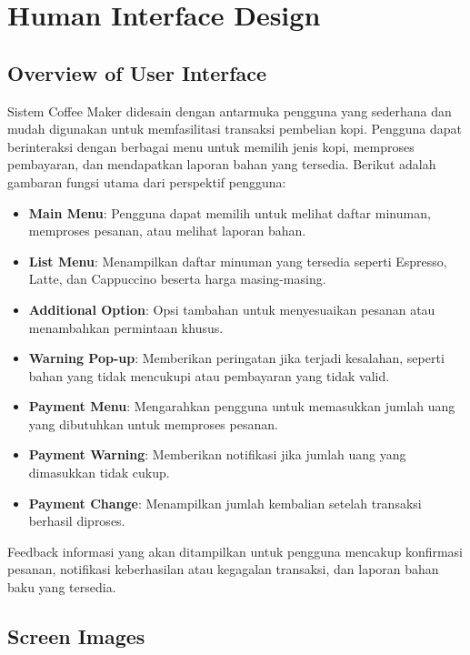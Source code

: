 \documentclass[12pt]{article}
\begin{document}
\section{Human Interface Design}

\subsection{Overview of User Interface}
Sistem Coffee Maker didesain dengan antarmuka pengguna yang sederhana dan mudah digunakan untuk memfasilitasi transaksi pembelian kopi. Pengguna dapat berinteraksi dengan berbagai menu untuk memilih jenis kopi, memproses pembayaran, dan mendapatkan laporan bahan yang tersedia. Berikut adalah gambaran fungsi utama dari perspektif pengguna:

\begin{itemize}
    \item \textbf{Main Menu}: Pengguna dapat memilih untuk melihat daftar minuman, memproses pesanan, atau melihat laporan bahan.
    \item \textbf{List Menu}: Menampilkan daftar minuman yang tersedia seperti Espresso, Latte, dan Cappuccino beserta harga masing-masing.
    \item \textbf{Additional Option}: Opsi tambahan untuk menyesuaikan pesanan atau menambahkan permintaan khusus.
    \item \textbf{Warning Pop-up}: Memberikan peringatan jika terjadi kesalahan, seperti bahan yang tidak mencukupi atau pembayaran yang tidak valid.
    \item \textbf{Payment Menu}: Mengarahkan pengguna untuk memasukkan jumlah uang yang dibutuhkan untuk memproses pesanan.
    \item \textbf{Payment Warning}: Memberikan notifikasi jika jumlah uang yang dimasukkan tidak cukup.
    \item \textbf{Payment Change}: Menampilkan jumlah kembalian setelah transaksi berhasil diproses.
\end{itemize}

Feedback informasi yang akan ditampilkan untuk pengguna mencakup konfirmasi pesanan, notifikasi keberhasilan atau kegagalan transaksi, dan laporan bahan baku yang tersedia.

\subsection{Screen Images}
\end{document}
